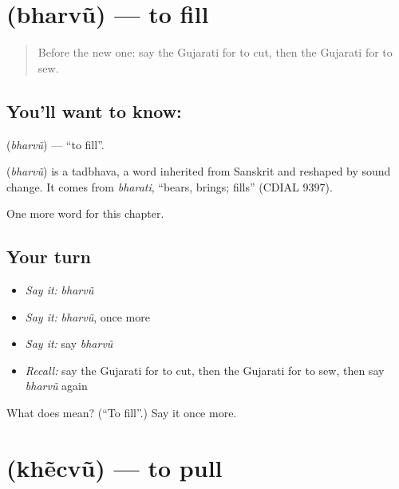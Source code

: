 \section[\texorpdfstring{\gu{ભરવું} (bharvũ)}{ભરવું (bharvũ)}]{ (bharvũ) — to fill}

\label{lesson:GU-C140-bharvu}



\begin{quote}
Before the new one: say the Gujarati for to cut, then the Gujarati for to sew.
\end{quote}

\subsection*{You'll want to know: }
\textbf{} (\emph{bharvũ}) — \textquotedblleft{}to fill\textquotedblright{}.

\begin{cousinweb}
\textbf{} (\emph{bharvũ}) is a tadbhava, a word inherited from Sanskrit and reshaped by sound change. It comes from \emph{bharati}, \textquotedblleft{}bears, brings; fills\textquotedblright{} (CDIAL 9397).
\end{cousinweb}

\begin{grammarlens}[title={What you've built}]
One more word for this chapter.
\end{grammarlens}

\subsection*{Your turn}
\begin{itemize}
\raggedright
  \item \emph{Say it:} \emph{bharvũ}
  \item \emph{Say it:} \emph{bharvũ}, once more
  \item \emph{Say it:} say \emph{bharvũ}
  \item \emph{Recall:} say the Gujarati for to cut, then the Gujarati for to sew, then say \emph{bharvũ} again
\end{itemize}

\begin{tcolorbox}[breakable,colback=teal!4,colframe=teal!35!black,title={Before you move on}]
What does  mean? (\textquotedblleft{}To fill\textquotedblright{}.) Say it once more.
\end{tcolorbox}
\section[\texorpdfstring{\gu{ખેંચવું} (khẽcvũ)}{ખેંચવું (khẽcvũ)}]{ (khẽcvũ) — to pull}

